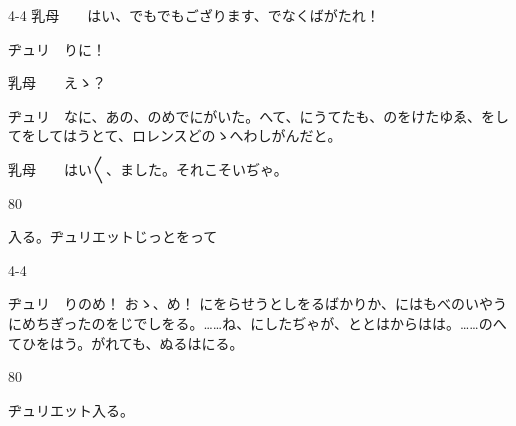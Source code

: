 \documentclass[tate,paper=b6j,jafontsize=9pt]{jlreq}
\begin{document}
\begin{azconvIndented}{4\zw}{-4\zw}
乳母　　はい、でもでもござります、でなくばがたれ！

ヂュリ　りに！

乳母　　えゝ？

ヂュリ　なに、あの、のめでにがいた。へて、にうてたも、のをけたゆゑ、をしてをしてはうとて、ロレンスどのゝへわしがんだと。

乳母　　はい{〳〵}、ました。それこそいぢゃ。

\end{azconvIndented}
\begin{azconvIndented}{8\zw}{0\zw}

入る。ヂュリエットじっとをって

\end{azconvIndented}
\begin{azconvIndented}{4\zw}{-4\zw}

ヂュリ　りのめ！ おゝ、め！ にをらせうとしをるばかりか、にはもべのいやうにめちぎったのをじでしをる。……ね、にしたぢゃが、ととはからはは。……のへてひをはう。がれても、ぬるはにる。

\end{azconvIndented}
\begin{azconvIndented}{8\zw}{0\zw}

ヂュリエット入る。

\end{azconvIndented}
\end{document}
